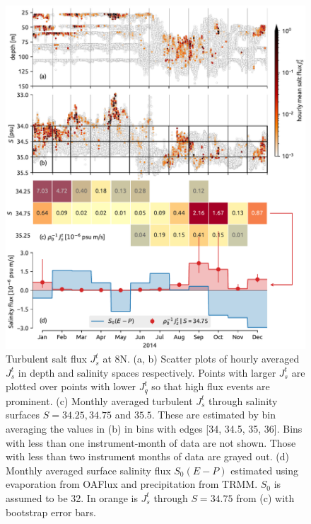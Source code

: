 \documentclass[twocol]{ametsoc}
\begin{document}
\begin{figure}
\centering
\includegraphics[width=\textwidth]{figure10-8n.pdf}
\caption{\label{fig:8njs}
Turbulent salt flux \(J_s^t\) at 8N. (a, b) Scatter plots of hourly averaged \(J_s^t\) in depth and salinity spaces respectively. Points with larger \(J_s^t\) are plotted over points with lower \(J_q^t\) so that high flux events are prominent. (c) Monthly averaged turbulent \(J_s^t\) through salinity surfaces \(S=34.25, 34.75\) and \(35.5\). These are estimated by bin averaging the values in (b) in bins with edges [34, 34.5, 35, 36]. Bins with less than one instrument-month of data are not shown. Those with less than two instrument months of data are grayed out. (d) Monthly averaged surface salinity flux \(S_0 (E-P)\) estimated using evaporation from OAFlux and precipitation from TRMM. \(S_0\) is assumed to be 32. In orange is \(J_s^t\) through \(S=34.75\) from (c) with bootstrap error bars.}
\end{figure}
\end{document}
